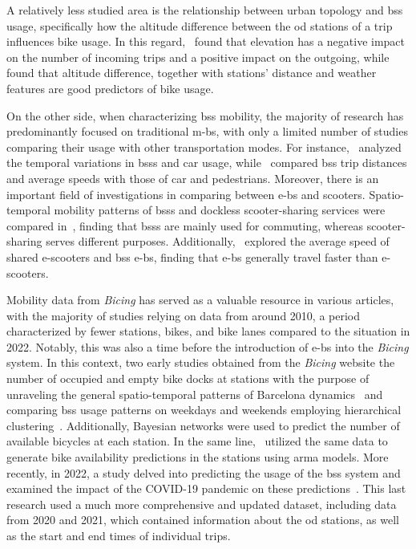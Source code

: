 A relatively less studied area is the relationship between urban topology and \ac{bss} usage, specifically how the altitude difference between the \ac{od} stations of a trip influences bike usage. In this regard,~\cite{Morency2015} found that elevation has a negative impact on the number of incoming trips and a positive impact on the outgoing, while~\cite{Kim2020} found that altitude difference, together with stations' distance and weather features are good predictors of bike usage.

On the other side, when characterizing \ac{bss} mobility, the majority of research has predominantly focused on traditional \acp{m-b}, with only a limited number of studies comparing their usage with other transportation modes. For instance,~\cite{Noussan2019} analyzed the temporal variations in \acp{bss} and car usage, while~\cite{Jensen2010} compared \ac{bss} trip distances and average speeds with those of car and pedestrians. Moreover, there is an important field of investigations in comparing between \acp{e-b} and scooters. Spatio-temporal mobility patterns of \acp{bss} and dockless scooter-sharing services were compared in~\cite{Mckenzie2019}, finding that \acp{bss} are mainly used for commuting, whereas scooter-sharing serves different purposes. Additionally,~\cite{Almannaa2020} explored the average speed of shared e-scooters and \ac{bss} \acp{e-b}, finding that \acp{e-b} generally travel faster than e-scooters.

Mobility data from \textit{Bicing} has served as a valuable resource in various articles, with the majority of studies relying on data from around 2010, a period characterized by fewer stations, bikes, and bike lanes compared to the situation in 2022. Notably, this was also a time before the introduction of \acp{e-b} into the \textit{Bicing} system. In this context, two early studies obtained from the \textit{Bicing} website the number of occupied and empty bike docks at stations with the purpose of unraveling the general spatio-temporal patterns of Barcelona dynamics~\cite{Froehlich2008} and comparing \ac{bss} usage patterns on weekdays and weekends employing hierarchical clustering~\cite{Froehlich2009}. Additionally, Bayesian networks were used to predict the number of available bicycles at each station. In the same line,~\cite{Kaltenbrunner2010} utilized the same data to generate bike availability predictions in the stations using \ac{arma} models. More recently, in 2022, a study delved into predicting the usage of the \ac{bss} system and examined the impact of the COVID-19 pandemic on these predictions~\cite{Bustamante2022}. This last research used a much more comprehensive and updated dataset, including data from 2020 and 2021, which contained information about the \ac{od} stations, as well as the start and end times of individual trips.



